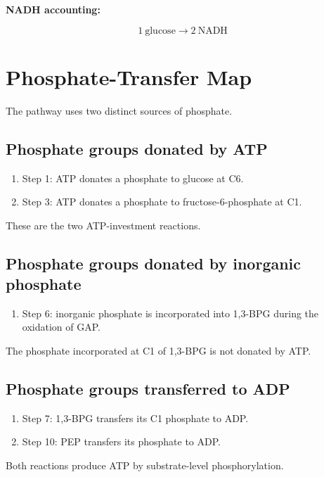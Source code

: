 \documentclass[11pt,a4paper]{article}
\begin{document}
\textbf{NADH accounting:}

\[
\boxed{
1\ \text{glucose} \longrightarrow 2\ \text{NADH}
}
\]

\section{Phosphate-Transfer Map}
\label{sec:phosphate-map}

The pathway uses two distinct sources of phosphate.

\subsection{Phosphate groups donated by ATP}

\begin{enumerate}
  \item Step 1: ATP donates a phosphate to glucose at C6.
  \item Step 3: ATP donates a phosphate to fructose-6-phosphate at C1.
\end{enumerate}

These are the two ATP-investment reactions.

\subsection{Phosphate groups donated by inorganic phosphate}

\begin{enumerate}
  \item Step 6: inorganic phosphate is incorporated into 1,3-BPG
  during the oxidation of GAP.
\end{enumerate}

The phosphate incorporated at C1 of 1,3-BPG is not donated by ATP.

\subsection{Phosphate groups transferred to ADP}

\begin{enumerate}
  \item Step 7: 1,3-BPG transfers its C1 phosphate to ADP.
  \item Step 10: PEP transfers its phosphate to ADP.
\end{enumerate}

Both reactions produce ATP by substrate-level phosphorylation.
\end{document}
